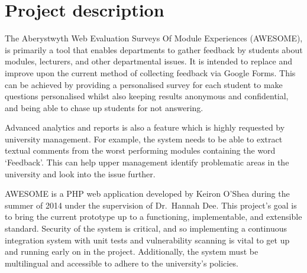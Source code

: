 \documentclass[11pt,fleqn,twoside]{article}
\begin{document}
\wordcount{}

\mmp

\setcounter{tocdepth}{3} %


\section{Project description}

The Aberystwyth Web Evaluation Surveys Of Module Experiences (AWESOME), is primarily a tool that enables departments to gather feedback by students about modules, lecturers, and other departmental issues.
It is intended to replace and improve upon the current method of collecting feedback via Google Forms.
This can be achieved by providing a personalised survey for each student to make questions personalised whilst also keeping results anonymous and confidential, and being able to chase up students for not answering.

Advanced analytics and reports is also a feature which is highly requested by university management.
For example, the system needs to be able to extract textual comments from the worst performing modules containing the word `Feedback'.
This can help upper management identify problematic areas in the university and look into the issue further.

AWESOME is a PHP web application developed by Keiron O'Shea during the summer of 2014 under the supervision of Dr.~Hannah Dee.
This project's goal is to bring the current prototype up to a functioning, implementable, and extensible standard.
Security of the system is critical, and so implementing a continuous integration system with unit tests and vulnerability scanning is vital to get up and running early on in the project.
Additionally, the system must be multilingual and accessible to adhere to the university's policies.
\end{document}
